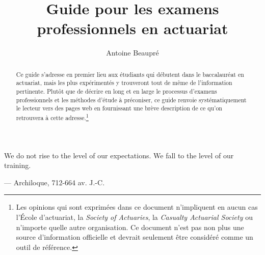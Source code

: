 \documentclass[11pt,french]{article}
\title{Guide pour les examens professionnels en actuariat}
\author{Antoine Beaupré}
\begin{document}
\maketitle
\thispagestyle{fancy}
\begin{abstract}
Ce guide s'adresse en premier lieu aux étudiants qui débutent dans le baccalauréat en actuariat, mais les plus expérimentés y trouveront tout de même de l'information pertinente. Plutôt que de décrire en long et en large le processus d'examens professionnels et les méthodes d'étude à préconiser, ce guide renvoie systématiquement le lecteur vers des pages web en fournissant une brève description de ce qu'on retrouvera à cette adresse.\footnote{Les opinions qui sont exprimées dans ce document n'impliquent en aucun cas l'École d'actuariat, la \emph{Society of Actuaries}, la \emph{Casualty Actuarial Society} ou n'importe quelle autre organisation. Ce document n'est pas non plus une source d'information officielle et devrait seulement être considéré comme un outil de référence.}{\tiny} 
\end{abstract}

\clearpage
{}
\begin{center}
\begin{minipage}{.6\textwidth}
\epigraph{We do not rise to the level of our expectations. We fall to the level of our training.}{--- \textup{Archiloque}, 712-664 av. J.-C.}
\end{minipage}
\end{center}
\clearpage

\newpage
\tableofcontents

\newpage
{}
\setcounter{page}{1}







\end{document}
